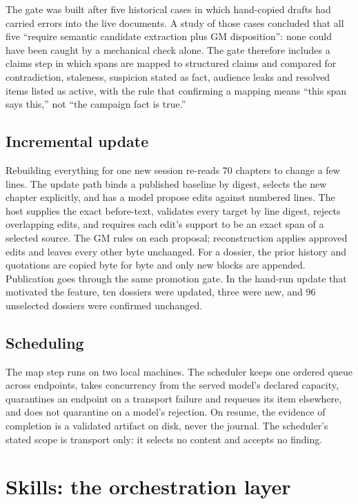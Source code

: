 \documentclass[11pt]{article}
\begin{document}
The gate was built after five historical cases in which hand-copied drafts had carried
errors into the live documents. A study of those cases concluded that all five ``require
semantic candidate extraction plus GM disposition'': none could have been caught by a
mechanical check alone. The gate therefore includes a claims step in which spans are
mapped to structured claims and compared for contradiction, staleness, suspicion stated
as fact, audience leaks and resolved items listed as active, with the rule that
confirming a mapping means ``this span says this,'' not ``the campaign fact is true.''

\subsection{Incremental update}

Rebuilding everything for one new session re-reads 70 chapters to change a few lines.
The update path binds a published baseline by digest, selects the new chapter explicitly,
and has a model propose edits against numbered lines. The host supplies the exact
before-text, validates every target by line digest, rejects overlapping edits, and
requires each edit's support to be an exact span of a selected source. The GM rules on
each proposal; reconstruction applies approved edits and leaves every other byte
unchanged. For a dossier, the prior history and quotations are copied byte for byte and
only new blocks are appended. Publication goes through the same promotion gate. In the
hand-run update that motivated the feature, ten dossiers were updated, three were new,
and 96 unselected dossiers were confirmed unchanged.

\subsection{Scheduling}

The map step runs on two local machines. The scheduler keeps one ordered queue across
endpoints, takes concurrency from the served model's declared capacity, quarantines an
endpoint on a transport failure and requeues its item elsewhere, and does not quarantine
on a model's rejection. On resume, the evidence of completion is a validated artifact on
disk, never the journal. The scheduler's stated scope is transport only: it selects no
content and accepts no finding.

\section{Skills: the orchestration layer}
\label{sec:skills}
\end{document}
